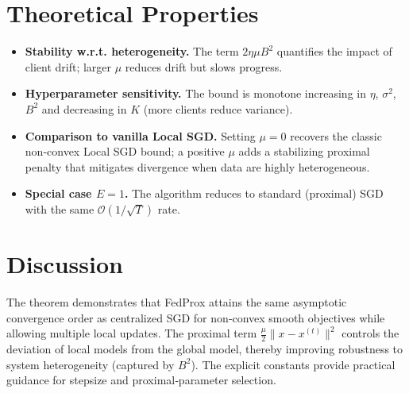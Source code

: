 \documentclass[11pt]{article}
\begin{document}
\section*{Theoretical Properties}
\begin{itemize}
\item \textbf{Stability w.r.t. heterogeneity.} The term $2\eta\mu B^{2}$ quantifies the impact of client drift; larger $\mu$ reduces drift but slows progress.
\item \textbf{Hyperparameter sensitivity.} The bound is monotone increasing in $\eta$, $\sigma^{2}$, $B^{2}$ and decreasing in $K$ (more clients reduce variance).
\item \textbf{Comparison to vanilla Local SGD.} Setting $\mu=0$ recovers the classic non‑convex Local SGD bound; a positive $\mu$ adds a stabilizing proximal penalty that mitigates divergence when data are highly heterogeneous.
\item \textbf{Special case $E=1$.} The algorithm reduces to standard (proximal) SGD with the same $\mathcal O(1/\sqrt{T})$ rate.
\end{itemize}

\section*{Discussion}
The theorem demonstrates that FedProx attains the same asymptotic convergence order as centralized SGD for non‑convex smooth objectives while allowing multiple local updates. The proximal term $\frac{\mu}{2}\|x-x^{(t)}\|^{2}$ controls the deviation of local models from the global model, thereby improving robustness to system heterogeneity (captured by $B^{2}$). The explicit constants provide practical guidance for stepsize and proximal‑parameter selection.

\newpage
\end{document}
